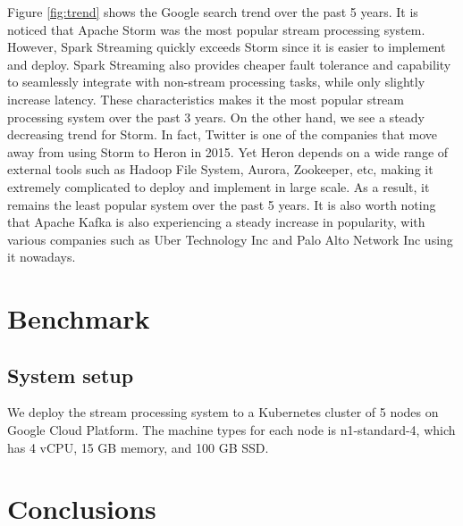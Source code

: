 \documentclass[pdftex,twocolumn,10pt,letterpaper]{article}
\begin{document}
Figure \ref{fig:trend} shows the Google search trend over the past 5 years. It is noticed that Apache Storm was the most popular stream processing system. However, Spark Streaming quickly exceeds Storm since it is easier to implement and deploy. Spark Streaming also provides cheaper fault tolerance and capability to seamlessly integrate with non-stream processing tasks, while only slightly increase latency. These characteristics makes it the most popular stream processing system over the past 3 years. On the other hand, we see a steady decreasing trend for Storm. In fact, Twitter is one of the companies that move away from using Storm to Heron in 2015. Yet Heron depends on a wide range of external tools such as Hadoop File System, Aurora, Zookeeper, etc, making it extremely complicated to deploy and implement in large scale. As a result, it remains the least popular system over the past 5 years. It is also worth noting that Apache Kafka is also experiencing a steady increase in popularity, with various companies such as Uber Technology Inc and Palo Alto Network Inc using it nowadays. 






\section{Benchmark}

\subsection{System setup}

We deploy the stream processing system to a Kubernetes cluster of 5 nodes on Google Cloud Platform. The machine types for each node is n1-standard-4, which has 4 vCPU, 15 GB memory, and 100 GB SSD. 

\section{Conclusions}

{


}
\end{document}

